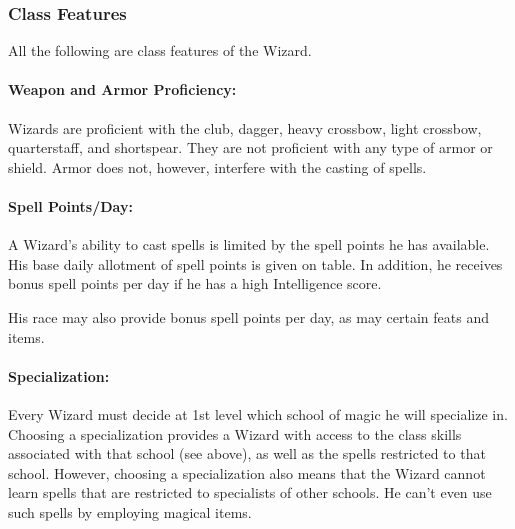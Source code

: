 \subsubsection{Class Features}
All the following are class features of the Wizard.

\paragraph{Weapon and Armor Proficiency:} Wizards are proficient with the club, dagger, heavy crossbow, light crossbow, quarterstaff, and shortspear. 
They are not proficient with any type of armor or shield. Armor does not, however, interfere with the casting of spells.

\paragraph{Spell Points/Day:} A Wizard's ability to cast spells is limited by the spell points he has available. 
His base daily allotment of spell points is given on  table. 
In addition, he receives bonus spell points per day if he has a high Intelligence score.

His race may also provide bonus spell points per day, as may certain feats and items.

\paragraph{Specialization:} Every Wizard must decide at 1st level which school of magic he will specialize in. 
Choosing a specialization provides a Wizard with access to the class skills associated with that school (see above), as well as the spells restricted to that school. 
However, choosing a specialization also means that the Wizard cannot learn spells that are restricted to specialists of other schools. 
He can't even use such spells by employing magical items.

